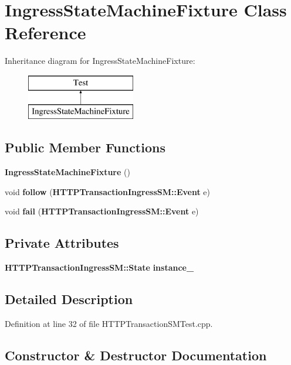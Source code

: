 \section{Ingress\+State\+Machine\+Fixture Class Reference}
\label{classIngressStateMachineFixture}
Inheritance diagram for Ingress\+State\+Machine\+Fixture\+:\begin{figure}[H]
\begin{center}
\leavevmode
\includegraphics[height=2.000000cm]{classIngressStateMachineFixture}
\end{center}
\end{figure}
\subsection*{Public Member Functions}
\begin{DoxyCompactItemize}
\item 
{\bf Ingress\+State\+Machine\+Fixture} ()
\item 
void {\bf follow} ({\bf H\+T\+T\+P\+Transaction\+Ingress\+S\+M\+::\+Event} e)
\item 
void {\bf fail} ({\bf H\+T\+T\+P\+Transaction\+Ingress\+S\+M\+::\+Event} e)
\end{DoxyCompactItemize}
\subsection*{Private Attributes}
\begin{DoxyCompactItemize}
\item 
{\bf H\+T\+T\+P\+Transaction\+Ingress\+S\+M\+::\+State} {\bf instance\+\_\+}
\end{DoxyCompactItemize}


\subsection{Detailed Description}


Definition at line 32 of file H\+T\+T\+P\+Transaction\+S\+M\+Test.\+cpp.



\subsection{Constructor \& Destructor Documentation}
